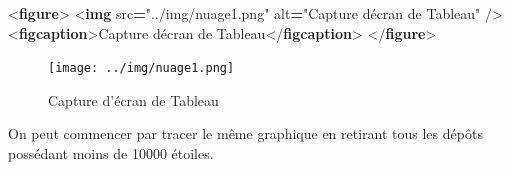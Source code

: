 \documentclass[
]{article}
\newenvironment{Shaded}{\begin{snugshade}}{\end{snugshade}}
\newcommand{\DataTypeTok}[1]{\textcolor[rgb]{0.13,0.29,0.53}{#1}}
\newcommand{\KeywordTok}[1]{\textcolor[rgb]{0.13,0.29,0.53}{\textbf{#1}}}
\newcommand{\NormalTok}[1]{#1}
\newcommand{\OperatorTok}[1]{\textcolor[rgb]{0.81,0.36,0.00}{\textbf{#1}}}
\newcommand{\OtherTok}[1]{\textcolor[rgb]{0.56,0.35,0.01}{#1}}
\newcommand{\StringTok}[1]{\textcolor[rgb]{0.31,0.60,0.02}{#1}}
\begin{document}
\begin{Shaded}
\begin{Highlighting}[]
\DataTypeTok{\textless{}}\KeywordTok{figure}\DataTypeTok{\textgreater{}}
  \DataTypeTok{\textless{}}\KeywordTok{img}\OtherTok{ src}\OperatorTok{=}\StringTok{"../img/nuage1.png"}\OtherTok{ alt}\OperatorTok{=}\StringTok{"Capture d\textquotesingle{}écran de Tableau"}\OtherTok{ }\DataTypeTok{/\textgreater{}}
  \DataTypeTok{\textless{}}\KeywordTok{figcaption}\DataTypeTok{\textgreater{}}\NormalTok{Capture d\textquotesingle{}écran de Tableau}\DataTypeTok{\textless{}/}\KeywordTok{figcaption}\DataTypeTok{\textgreater{}}
\DataTypeTok{\textless{}/}\KeywordTok{figure}\DataTypeTok{\textgreater{}}
\end{Highlighting}
\end{Shaded}

\begin{figure}
\centering
\texttt{[image: ../img/nuage1.png]}
\caption{Capture d'écran de Tableau}
\end{figure}

On peut commencer par tracer le même graphique en retirant tous les
dépôts possédant moins de 10000 étoiles.
\end{document}
